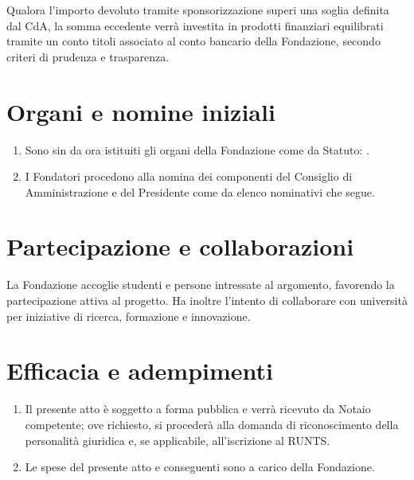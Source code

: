 Qualora l'importo devoluto tramite sponsorizzazione superi una soglia definita dal CdA, la somma eccedente verrà investita in prodotti finanziari equilibrati tramite un conto titoli associato al conto bancario della Fondazione, secondo criteri di prudenza e trasparenza.

\section*{Organi e nomine iniziali}
\begin{enumerate}[label=\arabic*)]
  \item Sono sin da ora istituiti gli organi della Fondazione come da Statuto: \OrganiElenco.
  \item I Fondatori procedono alla nomina dei componenti del Consiglio di Amministrazione e del Presidente come da elenco nominativi che segue.
\end{enumerate}

\section*{Partecipazione e collaborazioni}
La Fondazione accoglie studenti e persone intressate al argomento, favorendo la partecipazione attiva al progetto. Ha inoltre l’intento di collaborare con università per iniziative di ricerca, formazione e innovazione.

\section*{Efficacia e adempimenti}
\begin{enumerate}[label=\arabic*)]
  \item Il presente atto è soggetto a forma pubblica e verrà ricevuto da Notaio competente; ove richiesto, si procederà alla domanda di riconoscimento della personalità giuridica e, se applicabile, all'iscrizione al RUNTS.
  \item Le spese del presente atto e conseguenti sono a carico della Fondazione.
\end{enumerate}

\DataLuogo{\FondazioneCitta}{\today}



